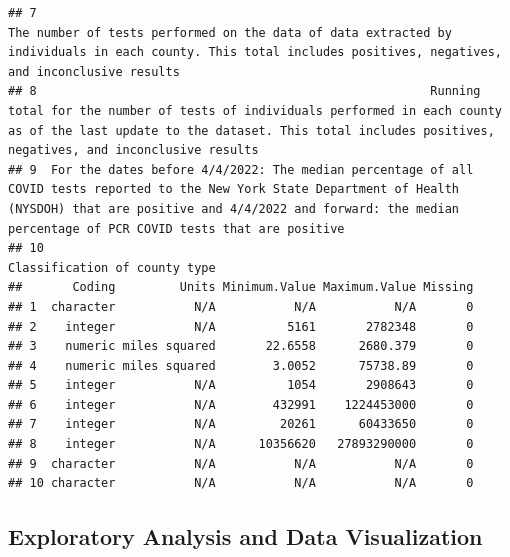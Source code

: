 \documentclass[
  12pt,
]{article}
\begin{document}
\begin{verbatim}
## 7                                                                                The number of tests performed on the data of data extracted by individuals in each county. This total includes positives, negatives, and inconclusive results
## 8                                                       Running total for the number of tests of individuals performed in each county as of the last update to the dataset. This total includes positives, negatives, and inconclusive results
## 9  For the dates before 4/4/2022: The median percentage of all COVID tests reported to the New York State Department of Health (NYSDOH) that are positive and 4/4/2022 and forward: the median percentage of PCR COVID tests that are positive
## 10                                                                                                                                                                                                               Classification of county type
##       Coding         Units Minimum.Value Maximum.Value Missing
## 1  character           N/A           N/A           N/A       0
## 2    integer           N/A          5161       2782348       0
## 3    numeric miles squared       22.6558      2680.379       0
## 4    numeric miles squared        3.0052      75738.89       0
## 5    integer           N/A          1054       2908643       0
## 6    integer           N/A        432991    1224453000       0
## 7    integer           N/A         20261      60433650       0
## 8    integer           N/A      10356620   27893290000       0
## 9  character           N/A           N/A           N/A       0
## 10 character           N/A           N/A           N/A       0
\end{verbatim}

\newpage

\hypertarget{exploratory-analysis-and-data-visualization}{%
\subsection{Exploratory Analysis and Data
Visualization}\label{exploratory-analysis-and-data-visualization}}
\end{document}
